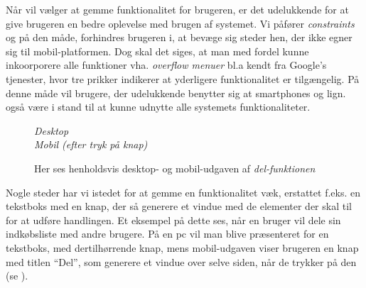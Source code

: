 Når vil vælger at gemme funktionalitet for brugeren, er det udelukkende for at give brugeren en bedre oplevelse med brugen af systemet.
Vi påfører \textit{constraints} og på den måde, forhindres brugeren i, at bevæge sig steder hen, der ikke egner sig til mobil-platformen.
Dog skal det siges, at man med fordel kunne inkoorporere alle funktioner vha. \textit{overflow menuer} bl.a kendt fra Google's tjenester, hvor tre prikker indikerer at yderligere funktionalitet er tilgængelig.
På denne måde vil brugere, der udelukkende benytter sig at smartphones og lign. også være i stand til at kunne udnytte alle systemets funktionaliteter.

\begin{figure}
\vspace{-30pt}
\begin{center}
\textit{Desktop}
\\
\vspace{10pt}
\textit{Mobil (efter tryk på knap)}
\end{center}
\vspace{-10pt}
\caption{Her ses henholdsvis desktop- og mobil-udgaven af \textit{del-funktionen}}\label{ss:share_diffs}
\vspace{-30pt}
\end{figure}
Nogle steder har vi istedet for at gemme en funktionalitet væk, erstattet f.eks. en tekstboks med en knap, der så generere et vindue med de elementer der skal til for at udføre handlingen. 
Et eksempel på dette ses, når en bruger vil dele sin indkøbsliste med andre brugere.
På en pc vil man blive præsenteret for en tekstboks, med dertilhørrende knap, mens mobil-udgaven viser brugeren en knap med titlen ``Del'', som generere et vindue over selve siden, når de trykker på den (se  ).

